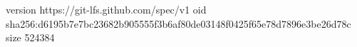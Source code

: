version https://git-lfs.github.com/spec/v1
oid sha256:d6195b7e7bc23682b905555f3b6af80de03148f0425f65e78d7896e3be26d78c
size 524384
